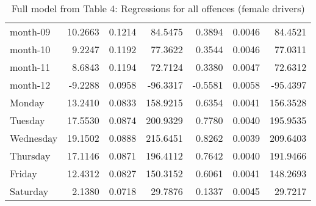 \documentclass[10pt]{article}
\begin{document}
\begin{table}[ht]
\begin{tabular}{lrrrrrr}
  month-09 & 10.2663 & 0.1214 & 84.5475 & 0.3894 & 0.0046 & 84.4521 \\ 
  month-10 & 9.2247 & 0.1192 & 77.3622 & 0.3544 & 0.0046 & 77.0311 \\ 
  month-11 & 8.6843 & 0.1194 & 72.7124 & 0.3380 & 0.0047 & 72.6312 \\ 
  month-12 & -9.2288 & 0.0958 & -96.3317 & -0.5581 & 0.0058 & -95.4397 \\ 
  Monday & 13.2410 & 0.0833 & 158.9215 & 0.6354 & 0.0041 & 156.3528 \\ 
  Tuesday & 17.5530 & 0.0874 & 200.9329 & 0.7780 & 0.0040 & 195.9535 \\ 
  Wednesday & 19.1502 & 0.0888 & 215.6451 & 0.8262 & 0.0039 & 209.6403 \\ 
  Thursday & 17.1146 & 0.0871 & 196.4112 & 0.7642 & 0.0040 & 191.9466 \\ 
  Friday & 12.4312 & 0.0827 & 150.3152 & 0.6061 & 0.0041 & 148.2693 \\ 
  Saturday & 2.1380 & 0.0718 & 29.7876 & 0.1337 & 0.0045 & 29.7217 \\ 
   \hline
\end{tabular}
\caption{Full model from Table 4: Regressions for all offences (female drivers)} 
\label{tab_4_all_pts_no_age_F}
\end{table}


\clearpage
\pagebreak



\end{document}
